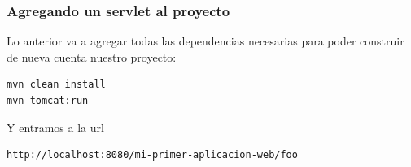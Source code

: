 \documentclass{beamer}
\begin{document}
\begin{frame}[fragile]
  \frametitle{Agregando un servlet al proyecto}
  Lo anterior va a agregar todas las dependencias necesarias para poder construir
  de nueva cuenta nuestro proyecto:

\begin{verbatim}
mvn clean install
mvn tomcat:run
\end{verbatim}

Y entramos a la url

\begin{verbatim}
http://localhost:8080/mi-primer-aplicacion-web/foo
\end{verbatim}

\end{frame}
\end{document}

